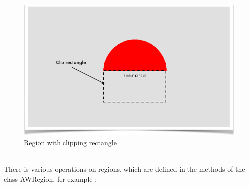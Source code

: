 \documentclass[a4paper,11pt]{extarticle}
\begin{document}
\begin{figure}[htbp]
   \centering
   \includegraphics[scale=0.7]{AWFig8.png} 
   \caption{Region with clipping rectangle}
   \label{fig:8 }
\end{figure}

~\\ There is various operations on regions, which are defined in the methods of the class AWRegion, for example :
\end{document}
